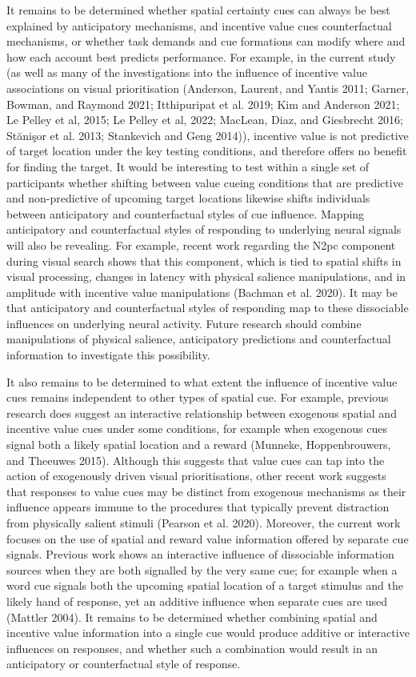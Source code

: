 \documentclass[11pt,halfline,a4paper,]{ouparticle}
\begin{document}
It remains to be determined whether spatial certainty cues can always be best explained by anticipatory mechanisms, and incentive value cues counterfactual mechanisms, or whether task demands and cue formations can modify where and how each account best predicts performance. For example, in the current study (as well as many of the investigations into the influence of incentive value associations on visual prioritisation (Anderson, Laurent, and Yantis 2011; Garner, Bowman, and Raymond 2021; Itthipuripat et al. 2019; Kim and Anderson 2021; Le Pelley et al, 2015; Le Pelley et al, 2022; MacLean, Diaz, and Giesbrecht 2016; Stănişor et al. 2013; Stankevich and Geng 2014)), incentive value is not predictive of target location under the key testing conditions, and therefore offers no benefit for finding the target. It would be interesting to test within a single set of participants whether shifting between value cueing conditions that are predictive and non-predictive of upcoming target locations likewise shifts individuals between anticipatory and counterfactual styles of cue influence. Mapping anticipatory and counterfactual styles of responding to underlying neural signals will also be revealing. For example, recent work regarding the N2pc component during visual search shows that this component, which is tied to spatial shifts in visual processing, changes in latency with physical salience manipulations, and in amplitude with incentive value manipulations (Bachman et al. 2020). It may be that anticipatory and counterfactual styles of responding map to these dissociable influences on underlying neural activity. Future research should combine manipulations of physical salience, anticipatory predictions and counterfactual information to investigate this possibility.

It also remains to be determined to what extent the influence of incentive value cues remains independent to other types of spatial cue. For example, previous research does suggest an interactive relationship between exogenous spatial and incentive value cues under some conditions, for example when exogenous cues signal both a likely spatial location and a reward (Munneke, Hoppenbrouwers, and Theeuwes 2015). Although this suggests that value cues can tap into the action of exogenously driven visual prioritisations, other recent work suggests that responses to value cues may be distinct from exogenous mechanisms as their influence appears immune to the procedures that typically prevent distraction from physically salient stimuli (Pearson et al. 2020). Moreover, the current work focuses on the use of spatial and reward value information offered by separate cue signals. Previous work shows an interactive influence of dissociable information sources when they are both signalled by the very same cue; for example when a word cue signals both the upcoming spatial location of a target stimulus and the likely hand of response, yet an additive influence when separate cues are used (Mattler 2004). It remains to be determined whether combining spatial and incentive value information into a single cue would produce additive or interactive influences on responses, and whether such a combination would result in an anticipatory or counterfactual style of response.
\end{document}
